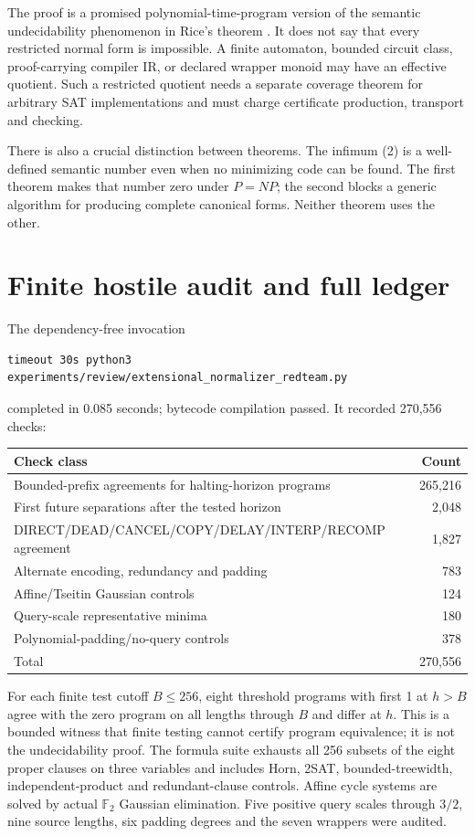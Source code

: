 \documentclass[11pt]{article}
\begin{document}
The proof is a promised polynomial-time-program version of the semantic
undecidability phenomenon in Rice's theorem \cite{rice}.  It does not say
that every restricted normal form is impossible.  A finite automaton, bounded
circuit class, proof-carrying compiler IR, or declared wrapper monoid may have
an effective quotient.  Such a restricted quotient needs a separate coverage
theorem for arbitrary SAT implementations and must charge certificate
production, transport and checking.

There is also a crucial distinction between theorems.  The infimum (2) is a
well-defined semantic number even when no minimizing code can be found.
The first theorem makes that number zero under $P=NP$; the second blocks a
generic algorithm for producing complete canonical forms.  Neither theorem
uses the other.

\section{Finite hostile audit and full ledger}

The dependency-free invocation
\begin{verbatim}
timeout 30s python3 experiments/review/extensional_normalizer_redteam.py
\end{verbatim}
completed in 0.085 seconds; bytecode compilation passed.  It recorded 270,556
checks:
\begin{center}\small
\begin{tabular}{@{}lr@{}}
\toprule
Check class & Count\\ \midrule
Bounded-prefix agreements for halting-horizon programs & 265,216\\
First future separations after the tested horizon & 2,048\\
DIRECT/DEAD/CANCEL/COPY/DELAY/INTERP/RECOMP agreement & 1,827\\
Alternate encoding, redundancy and padding & 783\\
Affine/Tseitin Gaussian controls & 124\\
Query-scale representative minima & 180\\
Polynomial-padding/no-query controls & 378\\
\midrule
Total & 270,556\\
\bottomrule
\end{tabular}
\end{center}

For each finite test cutoff $B\le256$, eight threshold programs with first 1
at $h>B$ agree with the zero program on all lengths through $B$ and differ at
$h$.  This is a bounded witness that finite testing cannot certify program
equivalence; it is not the undecidability proof.  The formula suite exhausts
all 256 subsets of the eight proper clauses on three variables and includes
Horn, 2SAT, bounded-treewidth, independent-product and redundant-clause
controls.  Affine cycle systems are solved by actual $\mathbb F_2$ Gaussian
elimination.  Five positive query scales through $3/2$, nine source lengths,
six padding degrees and the seven wrappers were audited.
\end{document}
